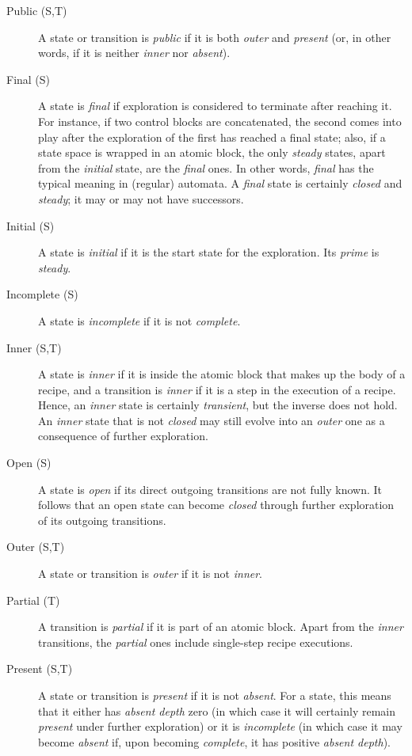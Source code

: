 \documentclass{article}
\begin{document}
\begin{description}
\item[Public (S,T)] A state or transition is \emph{public} if it is both \emph{outer} and \emph{present} (or, in other words, if it is neither \emph{inner} nor \emph{absent}).

\item[Final (S)] A state is \emph{final} if exploration is considered to terminate after reaching it. For instance, if two control blocks are concatenated, the second comes into play after the exploration of the first has reached a final state; also, if a state space is wrapped in an atomic block, the only \emph{steady} states, apart from the \emph{initial} state, are the \emph{final} ones. In other words, \emph{final} has the typical meaning in (regular) automata. A \emph{final} state is certainly \emph{closed} and \emph{steady}; it may or may not have successors.

\item[Initial (S)] A state is \emph{initial} if it is the start state for the exploration. Its \emph{prime} is \emph{steady}.

\item[Incomplete (S)] A state is \emph{incomplete} if it is not \emph{complete}.

\item[Inner (S,T)] A state is \emph{inner} if it is inside the atomic block that makes up the body of a recipe, and a transition is \emph{inner} if it is a step in the execution of a recipe. Hence, an \emph{inner} state is certainly \emph{transient}, but the inverse does not hold. An \emph{inner} state that is not \emph{closed} may still evolve into an \emph{outer} one as a consequence of further exploration.

\item[Open (S)] A state is \emph{open} if its direct outgoing transitions are not fully known. It follows that an open state can become \emph{closed} through further exploration of its outgoing transitions.

\item[Outer (S,T)] A state or transition is \emph{outer} if it is not \emph{inner}.

\item[Partial (T)] A transition is \emph{partial} if it is part of an atomic block. Apart from the \emph{inner} transitions, the \emph{partial} ones include single-step recipe executions.

\item[Present (S,T)] A state or transition is \emph{present} if it is not \emph{absent}. For a state, this means that it either has \emph{absent depth} zero (in which case it will certainly remain \emph{present} under further exploration) or it is \emph{incomplete} (in which case it may become \emph{absent} if, upon becoming \emph{complete}, it has positive \emph{absent depth}).


\end{description}
\end{document}
